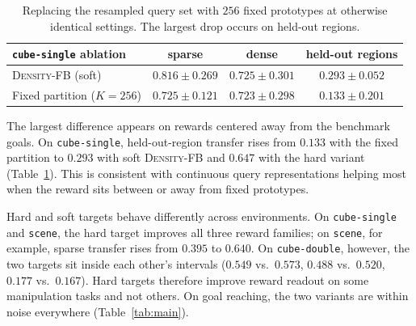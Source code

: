 \documentclass{article}
\newcommand{\DensityFB}{\textsc{Density-FB}}
\begin{document}
\begin{table}[h]
\centering
\small
\begin{tabular}{lccc}
\toprule
\texttt{cube-single} ablation
& sparse
& dense
& held-out regions \\
\midrule

\DensityFB{} (soft)
& $0.816 \pm 0.269$
& $0.725 \pm 0.301$
& $0.293 \pm 0.052$ \\

Fixed partition ($K{=}256$)
& $0.725 \pm 0.121$
& $0.723 \pm 0.298$
& $0.133 \pm 0.201$ \\
\bottomrule
\end{tabular}
\caption{
Replacing the resampled query set with $256$ fixed prototypes at otherwise identical settings.
The largest drop occurs on held-out regions.
}
\label{tab:partition}
\end{table}

The largest difference appears on rewards centered away from the benchmark goals.
On \texttt{cube-single}, held-out-region transfer rises from $0.133$ with the fixed partition to $0.293$ with soft \DensityFB{} and $0.647$ with the hard variant (Table~\ref{tab:partition}).
This is consistent with continuous query representations helping most when the reward sits between or away from fixed prototypes.

Hard and soft targets behave differently across environments.
On \texttt{cube-single} and \texttt{scene}, the hard target improves all three reward families; on \texttt{scene}, for example, sparse transfer rises from $0.395$ to $0.640$.
On \texttt{cube-double}, however, the two targets sit inside each other's intervals ($0.549$ vs.\ $0.573$, $0.488$ vs.\ $0.520$, $0.177$ vs.\ $0.167$).
Hard targets therefore improve reward readout on some manipulation tasks and not others.
On goal reaching, the two variants are within noise everywhere (Table~\ref{tab:main}).
\end{document}
